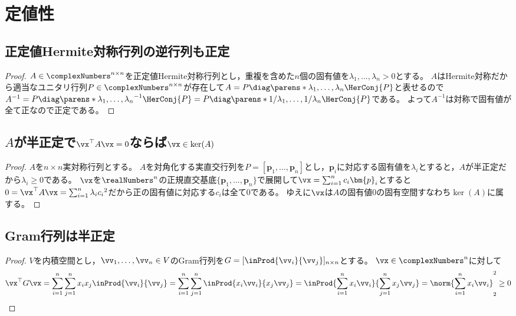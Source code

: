 \chapter{定値性}
    \section{正定値Hermite対称行列の逆行列も正定}
        \begin{proof}
            $A\in\complexNumbers^{n\times n}$を正定値Hermite対称行列とし，重複を含めた$n$個の固有値を$\lambda_1,\dotsc,\lambda_n > 0$とする。
            $A$はHermite対称だから適当なユニタリ行列$P\in\complexNumbers^{n\times n}$が存在して$A = P\diag\parens*{\lambda_1,\dotsc,\lambda_n}\HerConj{P}$と表せるので
            $A^{-1} = P\diag\parens*{\lambda_1,\dotsc,\lambda_n}^{-1}\HerConj{P} = P\diag\parens*{1/\lambda_1,\dotsc,1/\lambda_n}\HerConj{P}$である。
            よって$A^{-1}$は対称で固有値が全て正なので正定である。
        \end{proof}
    \section{\texorpdfstring{$A$}{A}が半正定で\texorpdfstring{$\vx^\top A\vx=0$}{x\string^⊤Ax = 0}ならば\texorpdfstring{$\vx\in\ker(A)$}{x∈Ker(A)}}
        \begin{proof}
            $A$を$n\times n$実対称行列とする。
            $A$を対角化する実直交行列を$P = [\bm{p}_1,\dotsc,\bm{p}_n]$とし，$\bm{p}_i$に対応する固有値を$\lambda_i$とすると，$A$が半正定だから$\lambda_i\geq 0$である。
            $\vx$を$\realNumbers^n$の正規直交基底$\{\bm{p}_1,\dotsc,\bm{p}_n\}$で展開して$\vx = \sum_{i=1}^n c_i\bm{p}_i$とすると$0 = \vx^\top A\vx = \sum_{i=1}^n \lambda_i {c_i}^2$だから正の固有値に対応する$c_i$は全て0である。
            ゆえに$\vx$は$A$の固有値$0$の固有空間すなわち$\ker(A)$に属する。
        \end{proof}
    \section{Gram行列は半正定}
        \begin{proof}
            $V$を内積空間とし，$\vv_1,\dotsc,\vv_n\in V$のGram行列を$G=[\inProd{\vv_i}{\vv_j}]_{n\times n}$とする。
            $\vx\in \complexNumbers^n$に対して
            \[ \vx^\top G\vx = \sum_{i=1}^n\sum_{j=1}^n x_i x_j \inProd{\vv_i}{\vv_j} = \sum_{i=1}^n\sum_{j=1}^n \inProd{x_i\vv_i}{x_j\vv_j} = \inProd{\sum_{i=1}^n x_i\vv_i}{\sum_{j=1}^n x_j\vv_j} = \norm{\sum_{i=1}^n x_i\vv_i}_2^2 \geq 0 \]
        \end{proof}
